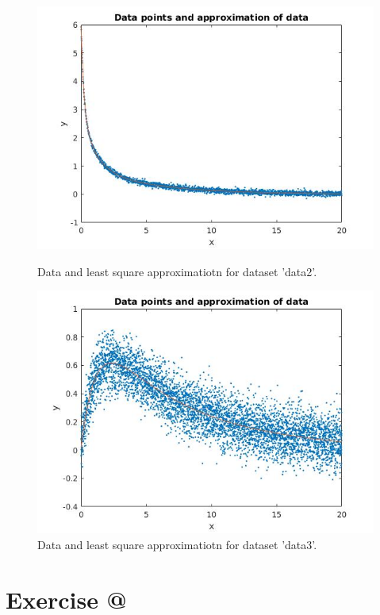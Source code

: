 \documentclass[12pt]{article}
\makeatletter
\newcommand*{\rom}[1]{\expandafter\@slowromancap\romannumeral #1@}
\makeatother
\begin{document}
\begin{figure}[H]
{}
%
\parbox[t]{0.4\textwidth}{
	\includegraphics[width=\linewidth,natwidth=610,natheight=642]{ex1_data2.jpg}
	\caption{Data and least square approximatiotn for dataset 'data2'.}
}
\hfill
\parbox[t]{0.4\textwidth }{
	\includegraphics[width =\linewidth,natwidth=610,natheight=642]{ex1_data3.jpg}
	\caption{Data and least square approximatiotn for dataset 'data3'.}
 }
 \end{figure}
\section*{Exercise \rom{2}}
\end{document}
